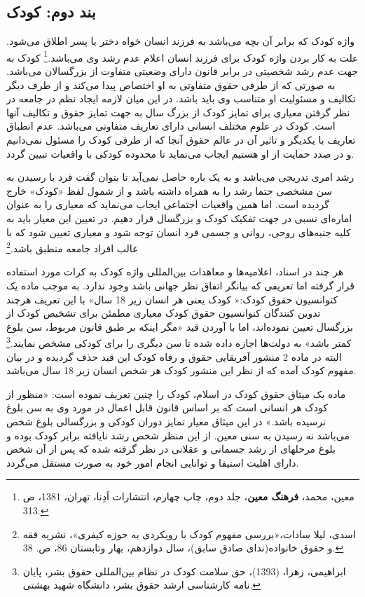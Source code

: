 	
	\subsection*{بند دوم: کودک}
واژه کودک که برابر آن بچه می‌باشد به فرزند انسان خواه دختر یا پسر اطلاق می‌شود. علت به کار بردن واژه کودک برای فرزند انسان اعلام عدم رشد وی می‌باشد.\footnote{معین، محمد، \textbf{فرهنگ معین}، جلد دوم، چاپ چهارم، انتشارات اَدِنا، تهران، 1381، ص 313.} کودک به جهت عدم رشد شخصیتی در برابر قانون دارای وضعیتی متفاوت از بزرگسالان می‌باشد. به صورتی که از طرفی حقوق متفاوتی به او اختصاص پیدا می‌کند و از طرف دیگر تکالیف و مسئولیت او متناسب وی باید باشد. در این میان لازمه ایجاد نظم در جامعه در نظر گرفتن معیاری برای تمایز کودک از بزرگ سال به جهت تمایز حقوق و تکالیف آنها است.  کودک در علوم مختلف انسانی دارای تعاریف متفاوتی می‌باشد. عدم انطباق تعاریف با یکدیگر و تاثیر آن در عالم حقوق آنجا که از طرفی کودک را مسئول نمی‌دانیم و در صدد حمایت از او هستیم ایجاب می‌نماید تا محدوده کودکی با واقعیات تبیین گردد. 

رشد امری تدریجی می‌باشد و به یک باره حاصل نمی‌آید تا بتوان گفت فرد با رسیدن به سن مشخصی حتما رشد را به همراه داشته باشد و از شمول لفظ «کودک» خارج گردیده است. اما همین واقعیات اجتماعی ایجاب می‌نماید که معیاری را به عنوان اماره‌ای نسبی در جهت تفکیک کودک و بزرگسال قرار دهیم. در تعیین این معیار باید به کلیه جنبه‌های روحی، روانی و جسمی فرد انسان توجه شود و معیاری تعیین شود که با غالب افراد جامعه منطبق باشد.\footnote{ اسدی، لیلا سادات،«بررسی مفهوم کودک با رویکردی به حوزه کیفری»، نشریه فقه و حقوق خانواده(ندای صادق سابق)، سال دوازدهم، بهار وتابستان 86، ص. 38.} 

هر چند در اسناد، اعلامیه‌ها و معاهدات بین‌المللی واژه کودک به کرات مورد استفاده قرار گرفته اما تعریفی که بیانگر اتفاق نظر جهانی باشد وجود ندارد. به موجب ماده یک کنوانسیون حقوق کودک:« کودک یعنی هر انسان زیر 18 سال» با این تعریف هرچند تدوین کنندگان کنوانسیون حقوق کودک معیاری مطمئن برای تشخیص کودک از بزرگسال تعیین نموده‌اند، اما با آوردن قید «مگر اینکه بر طبق قانون مربوط، سن بلوغ کمتر باشد» به دولت‌ها اجازه داده شده تا سن دیگری را برای کودکی مشخص نمایند.\footnote{
	ابراهیمی، زهرا، (1393)، حق سلامت کودک در نظام بین‌المللی حقوق بشر، پایان نامه کارشناسی ارشد حقوق بشر، دانشگاه شهید بهشتی.
}  البته در ماده 2 منشور آفریقایی حقوق و رفاه کودک این قید حذف گردیده و در بیان مفهوم کودک آمده که از نظر این منشور کودک هر شخص انسان زیر 18 سال می‌باشد. 

ماده یک میثاق حقوق کودک در اسلام، کودک را چنین تعریف نموده است: «منظور از کودک هر انسانی است که بر اساس قانون قابل اعمال در مورد وی به سن بلوغ نرسیده باشد.» در این میثاق معیار تمایز دوران کودکی و بزرگسالی بلوغ شخص می‌باشد نه رسیدن به سنی معین. از این منظر شخص رشد نایافته برابر کودک بوده و بلوغ مرحلهای از رشد جسمانی و عقلانی در نظر گرفته شده که پس از آن شخص دارای اهلیت استیفا و توانایی انجام امور خود به صورت مستقل می‌گردد. 

